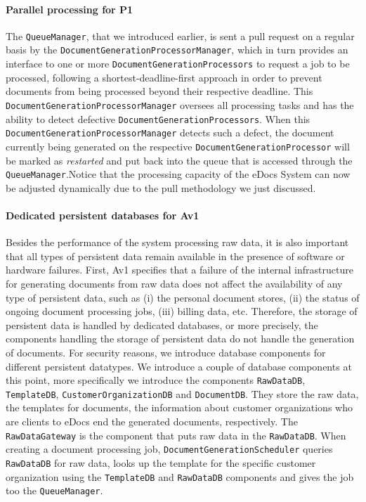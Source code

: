 \documentclass[a4paper,10pt]{article}
\begin{document}
\paragraph{Parallel processing for P1}
The \texttt{QueueManager}, that we introduced earlier, is sent a pull request on a regular basis by the \texttt{DocumentGenerationProcessorManager}, which in turn provides an interface to one or more \texttt{DocumentGenerationProcessors} to request a job to be processed, following a shortest-deadline-first approach in order to prevent documents from being processed beyond their respective deadline. This \texttt{DocumentGenerationProcessorManager} oversees all processing tasks and has the ability to detect defective \texttt{DocumentGenerationProcessors}. When this \texttt{DocumentGenerationProcessorManager} detects such a defect, the document currently being generated on the respective \texttt{DocumentGenerationProcessor} will be marked as \textit{restarted} and put back into the queue that is accessed through the \texttt{QueueManager}.Notice that the processing capacity of the eDocs System can now be adjusted dynamically due to the pull methodology we just discussed.

\paragraph{Dedicated persistent databases for Av1}
Besides the performance of the system processing raw data, it is also important that all types of persistent data remain available in the presence of software or hardware failures.
First, Av1 specifies that a failure of the internal infrastructure for generating documents from raw data does not affect the availability of any type of persistent data, such as (i) the personal document stores, (ii) the status of ongoing document processing jobs, (iii) billing data, etc. Therefore, the storage of persistent data is handled by dedicated databases, or more precisely, the components handling the storage of persistent data do not handle the generation of documents. For security reasons, we introduce database components for different persistent datatypes. We introduce   a couple of database components at this point, more specifically we introduce the components \texttt{RawDataDB}, \texttt{TemplateDB}, \texttt{CustomerOrganizationDB} and \texttt{DocumentDB}. They store the raw data, the templates for documents, the information about customer organizations who are clients to eDocs end the generated documents, respectively. The \texttt{RawDataGateway} is the component that puts raw data in the \texttt{RawDataDB}. When creating a document processing job,  \texttt{DocumentGenerationScheduler} queries \texttt{RawDataDB} for raw data, looks up the template for the specific  customer organization using the \texttt{TemplateDB} and \texttt{RawDataDB} components and gives the job too the \texttt{QueueManager}.
\end{document}

